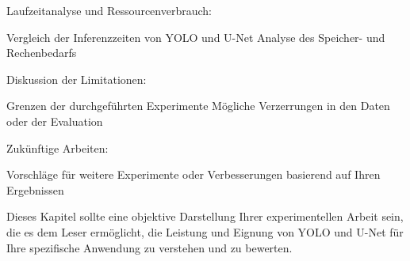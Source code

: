 Laufzeitanalyse und Ressourcenverbrauch:

Vergleich der Inferenzzeiten von YOLO und U-Net
Analyse des Speicher- und Rechenbedarfs


Diskussion der Limitationen:

Grenzen der durchgeführten Experimente
Mögliche Verzerrungen in den Daten oder der Evaluation


Zukünftige Arbeiten:

Vorschläge für weitere Experimente oder Verbesserungen basierend auf Ihren Ergebnissen



Dieses Kapitel sollte eine objektive Darstellung Ihrer experimentellen Arbeit sein, die es dem Leser ermöglicht, die Leistung und Eignung von YOLO und U-Net für Ihre spezifische Anwendung zu verstehen und zu bewerten.